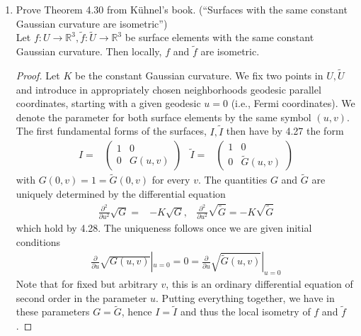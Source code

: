 \documentclass[12pt]{amsart}
\newcommand{\parti}[2]{\frac{\partial #1}{\partial #2}}
\begin{document}
\begin{enumerate}
\newpage
	\item Prove Theorem 4.30 from K\"uhnel's book. (``Surfaces with the same constant Gaussian curvature are isometric'')
	\\Let $f:U\to\mathbb{R}^3,\tilde f:\tilde U\to\mathbb{R}^3$ be surface elements with the same constant Gaussian curvature. Then locally, $f$ and $\tilde f$ are isometric.
	\begin{proof}
		Let $K$ be the constant Gaussian curvature. We fix two points in $U,\tilde U$ and introduce in appropriately chosen neighborhoods geodesic parallel coordinates, starting with a given geodesic $u=0$ (i.e., Fermi coordinates). We denote the parameter for both surface elements by the same symbol $(u,v)$. The first fundamental forms of the surfaces, $I,\tilde I$ then have by 4.27 the form
		\begin{align*}
			I=& \left(\begin{array}{cc}
				1 & 0 \\ 0 & G(u,v)
			\end{array}\right) & 
			\tilde I=&\left(\begin{array}{cc}
				1 & 0 \\ 0 & \tilde G(u,v)
			\end{array}\right)
		\end{align*}
		with $G(0,v)=1=\tilde G(0,v)$ for every $v$. The quantities $G$ and $\tilde G$ are uniquely determined by the differential equation
		\begin{align*}
			\parti{^2}{u^2}\sqrt G=&-K\sqrt G, & \parti{^2}{u^2}\sqrt{\tilde G}=-K\sqrt{\tilde G}
		\end{align*}
		which hold by 4.28. The uniqueness follows once we are given initial conditions
		\begin{align*}
			\parti{}{u}\sqrt{G(u,v)}|_{u=0}=0=\parti{}{u}\sqrt{\tilde G(u,v)}|_{u=0}
		\end{align*}
		Note that for fixed but arbitrary $v$, this is an ordinary differential equation of second order in the parameter $u$. Putting everything together, we have in these parameters $G=\tilde G$, hence $I=\tilde I$ and thus the local isometry of $f$ and $\tilde f$.
	\end{proof}


\end{enumerate}
\end{document}
